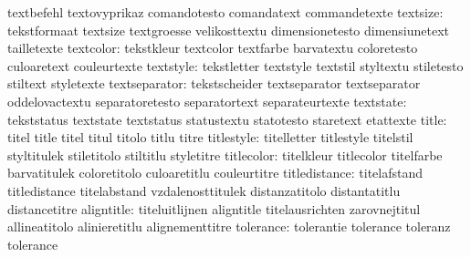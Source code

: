                            textbefehl                textovyprikaz
                           comandotesto              comandatext
                           commandetexte
                 textsize: tekstformaat              textsize
                           textgroesse               velikosttextu
                           dimensionetesto           dimensiunetext
                           tailletexte
                textcolor: tekstkleur                textcolor
                           textfarbe                 barvatextu
                           coloretesto               culoaretext
                           couleurtexte
                textstyle: tekstletter               textstyle
                           textstil                  styltextu
                           stiletesto                stiltext
                           styletexte
            textseparator: tekstscheider             textseparator
                           textseparator             oddelovactextu
                           separatoretesto           separatortext
                           separateurtexte
                textstate: tekststatus               textstate
                           textstatus                statustextu
                           statotesto                staretext
                           etattexte
                    title: titel                     title
                           titel                     titul
                           titolo                    titlu
                           titre
               titlestyle: titelletter               titlestyle
                           titelstil                 styltitulek
                           stiletitolo               stiltitlu
                           styletitre
               titlecolor: titelkleur                titlecolor
                           titelfarbe                barvatitulek
                           coloretitolo              culoaretitlu
                           couleurtitre
            titledistance: titelafstand              titledistance
                           titelabstand              vzdalenosttitulek
                           distanzatitolo            distantatitlu
                           distancetitre
               aligntitle: titeluitlijnen            aligntitle
                           titelausrichten           zarovnejtitul
                           allineatitolo             alinieretitlu
                           alignementtitre
                tolerance: tolerantie                tolerance
                           toleranz                  tolerance
